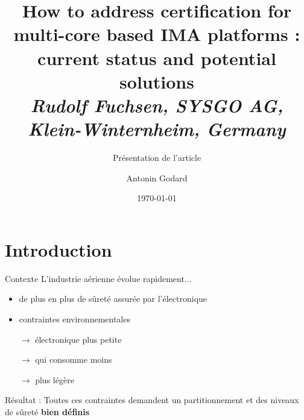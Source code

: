 \documentclass{beamer}
\begin{document}
\title[How to address certification for multi-core based IMA platforms :
       current status and potential solutions]{How to address certification for multi-core based IMA platforms :
       current status and potential solutions \\
   {\small \textit{Rudolf Fuchsen, SYSGO AG, Klein-Winternheim, Germany \cite{Fuch}}}} 
\subtitle{\vspace{1em} Présentation de l'article}
\author{ \vspace{4em} Antonin Godard} 
\date{\today} 

\begin{frame}[plain]
  \titlepage
\end{frame}



\section{Introduction}%
\label{sec:introduction}

\begin{frame}{Contexte}
	L'industrie aérienne évolue rapidement... \pause	
	\begin{itemize}
		\item de plus en plus de sûreté assurée par l'électronique\pause
		\item contraintes environnementales\pause
		\item[$\rightarrow$] électronique plus petite\pause
		\item[$\rightarrow$] qui consomme moins\pause
		\item[$\rightarrow$] plus légère\pause
	\end{itemize}
	
	\begin{alertblock}{Résultat :}
		Toutes ces contraintes demandent un partitionnement et des niveaux de sûreté
		\textbf{bien définis}
	\end{alertblock}

\end{frame}
\end{document}
